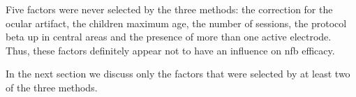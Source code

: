 Five factors were never selected by the three methods: the correction for the ocular artifact, the children maximum age, the number 
of sessions, the protocol beta up in central areas and the presence of more than one active electrode. Thus, these factors definitely appear 
not to have an influence on \gls{nfb} efficacy.  

In the next section we discuss only the factors that were selected by at least two of the three methods. 

